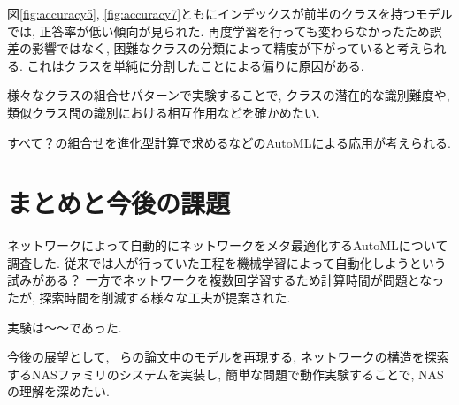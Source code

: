 \documentclass[twocolumn]{jarticle}     %
\begin{document}
図\ref{fig:accuracy5}, \ref{fig:accuracy7}ともにインデックスが前半のクラスを持つモデルでは, 正答率が低い傾向が見られた. 再度学習を行っても変わらなかったため誤差の影響ではなく, 困難なクラスの分類によって精度が下がっていると考えられる. これはクラスを単純に分割したことによる偏りに原因がある.

様々なクラスの組合せパターンで実験することで, クラスの潜在的な識別難度や, 類似クラス間の識別における相互作用などを確かめたい.

すべて？の組合せを進化型計算で求めるなどのAutoMLによる応用が考えられる.

\section{まとめと今後の課題}

ネットワークによって自動的にネットワークをメタ最適化するAutoMLについて調査した.
従来では人が行っていた工程を機械学習によって自動化しようという試みがある？
一方でネットワークを複数回学習するため計算時間が問題となったが, 探索時間を削減する様々な工夫が提案された.

実験は～～であった.

今後の展望として, ~らの論文中\cite{ANAS}のモデルを再現する, ネットワークの構造を探索するNASファミリのシステムを実装し,
簡単な問題で動作実験することで, NASの理解を深めたい.



\end{document}

